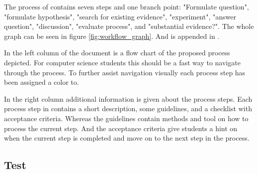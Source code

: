 \begin{minipage}{\linewidth}
The process of \checklist {} contains seven steps and one branch point: "Formulate question", "formulate hypothesis", "search for existing evidence", "experiment", "answer question", "discussion", "evaluate process", and "substantial evidence?". The whole graph can be seen in figure \ref{fig:workflow_graph}. And \checklist is appended in .

In the left column of the document is a flow chart of the proposed process depicted. For computer science students this should be a fast way to navigate through the process. To further assist navigation visually each process step has been assigned a color to.

In the right column additional information is given about the process steps. Each process step in \checklist contains a short description, some guidelines, and a checklist with acceptance criteria. Whereas the guidelines contain methods and tool on how to process the current step. And the acceptance criteria give students a hint on when the current step is completed and move on to the next step in the process.


\subsection{Test}
\lipsum[1]

\end{minipage}

